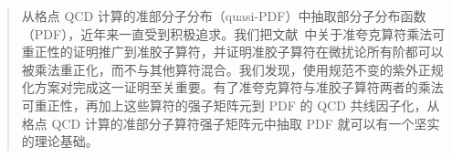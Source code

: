 \begin{abstract}
从格点 QCD 计算的准部分子分布（quasi-PDF）中抽取部分子分布函数（PDF），近年来一直受到积极追求。我们把文献~\cite{Ishikawa:2017faj}中关于准夸克算符乘法可重正性的证明推广到准胶子算符，并证明准胶子算符在微扰论所有阶都可以被乘法重正化，而不与其他算符混合。我们发现，使用规范不变的紫外正规化方案对完成这一证明至关重要。有了准夸克算符与准胶子算符两者的乘法可重正性，再加上这些算符的强子矩阵元到 PDF 的 QCD 共线因子化，从格点 QCD 计算的准部分子算符强子矩阵元中抽取 PDF 就可以有一个坚实的理论基础。
\end{abstract}
